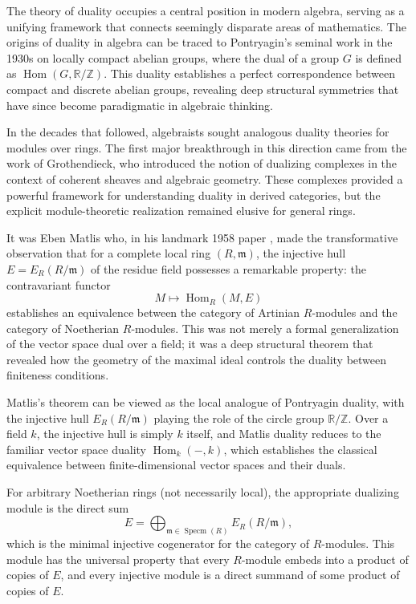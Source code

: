 \documentclass{kms-c}
\theoremstyle{plain}
\theoremstyle{definition}
\theoremstyle{remark}
\begin{document}
The theory of duality occupies a central position in modern algebra, serving as a unifying framework that connects seemingly disparate areas of mathematics. The origins of duality in algebra can be traced to Pontryagin's seminal work in the 1930s on locally compact abelian groups, where the dual of a group \( G \) is defined as \( \operatorname{Hom}(G, \mathbb{R}/\mathbb{Z}) \). This duality establishes a perfect correspondence between compact and discrete abelian groups, revealing deep structural symmetries that have since become paradigmatic in algebraic thinking.

In the decades that followed, algebraists sought analogous duality theories for modules over rings. The first major breakthrough in this direction came from the work of Grothendieck, who introduced the notion of dualizing complexes in the context of coherent sheaves and algebraic geometry. These complexes provided a powerful framework for understanding duality in derived categories, but the explicit module-theoretic realization remained elusive for general rings.

It was Eben Matlis who, in his landmark 1958 paper \cite{Matlis1958}, made the transformative observation that for a complete local ring \( (R, \mathfrak{m}) \), the injective hull \( E = E_R(R/\mathfrak{m}) \) of the residue field possesses a remarkable property: the contravariant functor 
\[
M \longmapsto \operatorname{Hom}_R(M, E)
\]
establishes an equivalence between the category of Artinian \( R \)-modules and the category of Noetherian \( R \)-modules. This was not merely a formal generalization of the vector space dual over a field; it was a deep structural theorem that revealed how the geometry of the maximal ideal controls the duality between finiteness conditions.

Matlis's theorem can be viewed as the local analogue of Pontryagin duality, with the injective hull \( E_R(R/\mathfrak{m}) \) playing the role of the circle group \( \mathbb{R}/\mathbb{Z} \). Over a field \( k \), the injective hull is simply \( k \) itself, and Matlis duality reduces to the familiar vector space duality \( \operatorname{Hom}_k(-, k) \), which establishes the classical equivalence between finite-dimensional vector spaces and their duals.

For arbitrary Noetherian rings (not necessarily local), the appropriate dualizing module is the direct sum
\[
E = \bigoplus_{\mathfrak{m} \in \operatorname{Specm}(R)} E_R(R/\mathfrak{m}),
\]
which is the minimal injective cogenerator for the category of \( R \)-modules. This module has the universal property that every \( R \)-module embeds into a product of copies of \( E \), and every injective module is a direct summand of some product of copies of \( E \).
\end{document}
